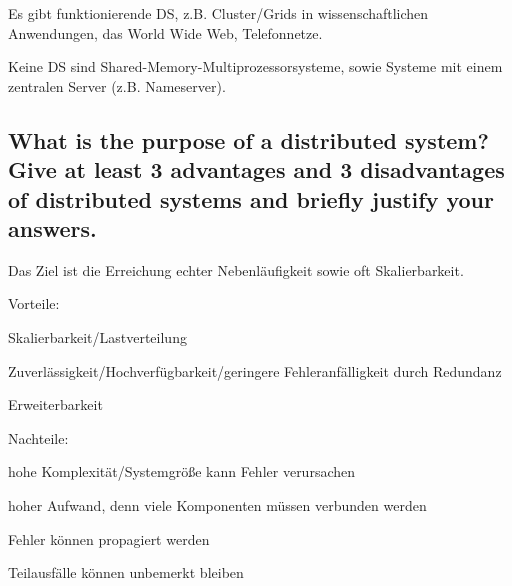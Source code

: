 \documentclass[a4paper,
			llpt,
			solution,
			accentcolor=tud2d,
			colorbacktitle
			]
			{tudexercise}
\begin{document}
Es gibt funktionierende DS, z.B. Cluster/Grids in wissenschaftlichen Anwendungen, das World Wide Web, Telefonnetze.

Keine DS sind Shared-Memory-Multiprozessorsysteme, sowie Systeme mit einem zentralen Server (z.B. Nameserver).


\subsection{What is the purpose of a distributed system? Give at least 3 advantages and 3 disadvantages of distributed systems and briefly justify your answers.}
Das Ziel ist die Erreichung echter Nebenläufigkeit sowie oft Skalierbarkeit.

Vorteile:
\begin{compactitem}
\item Skalierbarkeit/Lastverteilung
\item Zuverlässigkeit/Hochverfügbarkeit/geringere Fehleranfälligkeit durch Redundanz
\item Erweiterbarkeit
\end{compactitem}

Nachteile:
\begin{compactitem}
	\item hohe Komplexität/Systemgröße kann Fehler verursachen
	\item hoher Aufwand, denn viele Komponenten müssen verbunden werden
	\item Fehler können propagiert werden
	\item Teilausfälle können unbemerkt bleiben
\end{compactitem}
\end{document}
